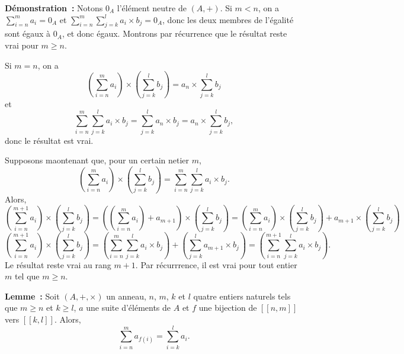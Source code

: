 \noindent\textbf{Démonstration :} 
    Notons $0_A$ l'élément neutre de $(A, +)$.
    Si $m < n$, on a $\sum_{i=n}^m a_i = 0_A$ et $\sum_{i=n}^m \sum_{j=k}^l a_i \times b_j = 0_A$, donc les deux membres de l'égalité sont égaux à $0_A$, et donc égaux.
    Montrons par récurrence que le résultat reste vrai pour $m \geq n$. 

    Si $m = n$, on a
    \begin{equation*}
        \left( \sum_{i=n}^m a_i \right) \times \left( \sum_{j=k}^l b_j \right) = a_n \times \sum_{j=k}^l b_j
    \end{equation*}
    et
    \begin{equation*}
        \sum_{i=n}^m \sum_{j=k}^l a_i \times b_j = \sum_{j=k}^l a_n \times b_j = a_n \times \sum_{j=k}^l b_j,
    \end{equation*}
    donc le résultat est vrai.

    Supposons maontenant que, pour un certain netier $m$,
    \begin{equation*}
        \left( \sum_{i=n}^m a_i \right) \times \left( \sum_{j=k}^l b_j \right) = \sum_{i=n}^m \sum_{j=k}^l a_i \times b_j .
    \end{equation*}
    Alors, 
    \begin{equation*}
        \left( \sum_{i=n}^{m+1} a_i \right) \times \left( \sum_{j=k}^l b_j \right)
        = \left( \left( \sum_{i=n}^m a_i \right) + a_{m+1} \right) \times \left( \sum_{j=k}^l b_j \right)
        = \left( \sum_{i=n}^m a_i \right) \times \left( \sum_{j=k}^l b_j \right) + a_{m+1} \times \left( \sum_{j=k}^l b_j \right)
    \end{equation*}
    \begin{equation*}
        \left( \sum_{i=n}^{m+1} a_i \right) \times \left( \sum_{j=k}^l b_j \right)
        = \left( \sum_{i=n}^m \sum_{j=k}^l a_i \times b_j \right) + \left( \sum_{j=k}^l a_{m+1} \times b_j \right)
        = \left( \sum_{i=n}^{m+1} \sum_{j=k}^l a_i \times b_j \right) .
    \end{equation*}
    Le résultat reste vrai au rang $m+1$.
    Par récurrrence, il est vrai pour tout entier $m$ tel que $m \geq n$.

    \done

\medskip

\noindent\textbf{Lemme :} Soit $(A, +, \times)$ un anneau, $n$, $m$, $k$ et $l$ quatre entiers naturels tels que $m \geq n$ et $k \geq l$, $a$ une suite d'éléments de $A$ et $f$ une bijection de $[\![n, m]\!]$ vers $[\![k, l]\!]$. 
    Alors,
    \begin{equation*}
        \sum_{i=n}^m a_{f(i)} = \sum_{i=k}^l a_i.
    \end{equation*}

